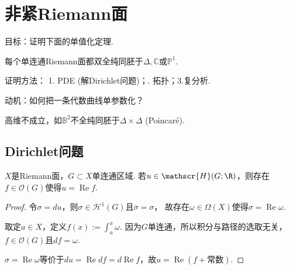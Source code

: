 
\newcommand{\bbC}{\mathbb{C}}
\newcommand{\calO}{\mathcal{O}}
\newcommand{\calE}{\mathcal{E}}
\newcommand{\calF}{\mathcal{F}}
\newcommand{\scrH}{\mathscr{H}}
\newcommand{\scrL}{\mathscr{L}}
\newcommand{\scrU}{\mathscr{U}}
\newcommand{\id}{\operatorname{id}}
\newcommand{\Ima}{\operatorname{Im}}
\newcommand{\Ker}{\operatorname{Ker}}
\newcommand{\Res}{\operatorname{Res}}
\newcommand{\Supp}{\operatorname{Supp}}
\newcommand{\ord}{\operatorname{ord}}
\newcommand{\Div}{\operatorname{Div}}
\newcommand{\Reg}{\operatorname{Reg}}
\renewcommand{\Re}{\operatorname{Re}}
\renewcommand{\Im}{\operatorname{Im}}
\newcommand{\Opartial}{\overline{\partial}}
\newcommand{\varep}{\varepsilon}
\newcommand{\Over}{\overline}



\section{非紧Riemann面}
目标：证明下面的单值化定理.
\begin{theorem}

	每个单连通Riemann面都双全纯同胚于$\Delta, \bbC$或$\mathbb{P}^1$.
\end{theorem}

证明方法：
1. PDE (解Dirichlet问题)；. 拓扑；\quad 3.复分析.

动机：如何把一条代数曲线单参数化？

\begin{remark}
	高维不成立，如$\mathbb{B}^2$不全纯同胚于$\Delta\times \Delta$ (Poincaré).
\end{remark}


\subsection{Dirichlet问题}
\begin{lemma}
	$X$是Riemann面，$G\subset X$单连通区域. 
    若$u\in \scrH(G;\R)$，则存在$f\in \calO(G)$使得$u=\Re f$.
\end{lemma}

\begin{proof}
	令$\sigma=du$，则$\sigma\in \scrH^1(G)$且$\Over{\sigma}=\sigma$，
    故存在$\omega\in \Omega(X)$使得$\sigma=\Re \omega$.\par
	取定$a\in X$，定义$f(x):=\int_a^x \omega$. 
    因为$G$单连通，所以积分与路径的选取无关，$f\in \calO(G)$且$df=\omega$.

	$\sigma=\Re \omega$等价于$du=\Re df=d \Re f$，故$u=\Re (f+\text{常数})$.
\end{proof}

